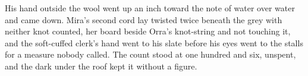 His hand outside the wool went up an inch toward the note of water over water and came down. Mira's second cord lay twisted twice beneath the grey with neither knot counted, her board beside Orra's knot-string and not touching it, and the soft-cuffed clerk's hand went to his slate before his eyes went to the stalls for a measure nobody called. The count stood at one hundred and six, unspent, and the dark under the roof kept it without a figure.
